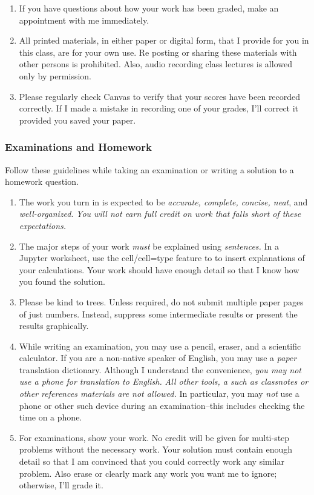 \documentclass[12pt,fullpage]{article}
\newcounter{ex}\setcounter{ex}{0}
\begin{document}
\begin{enumerate}
\item If you have questions about how your work has been graded, make
an appointment with me immediately.

\item All printed materials, in either paper or digital form, that I
provide for you in this class, are for your own use. Re posting or
sharing these materials with other persons is prohibited. Also,
audio recording class lectures is allowed only by permission.

\item Please regularly check Canvas  to verify that your scores have been recorded correctly.  If I made a mistake in recording one of
your grades, I'll correct it provided you saved your paper.

\end{enumerate}

\subsubsection*{Examinations and Homework}

Follow these guidelines while taking an examination or writing a solution to a homework question.

\begin{enumerate}

\item The work you turn in is expected to be \emph{accurate, complete, concise, neat}, and \emph{well-organized}.  \emph{You will not earn
full credit on work that falls short of these expectations.}

\item The major steps of your work \emph{must}  be explained using \emph{sentences.} In a  Jupyter worksheet, use the cell/cell=type feature to 
to insert explanations of your calculations. Your work should have enough detail so that I know how you found the solution. 

\item Please be kind to trees. Unless required, do not submit multiple paper pages of just numbers. Instead, suppress some intermediate results or 
present the results graphically.


\item While writing an examination, you may use a pencil, eraser, and a scientific calculator. If you are a non-native speaker of English,
you may use a \emph{paper} translation dictionary. Although I understand the convenience, \emph{you may not use a phone for translation to English.}
\emph{All other tools, a such as classnotes or other references materials are not allowed.} In particular, you may \emph{not} use a phone or other such
device during an examination--this includes checking the time on a phone.


\item For examinations, show your work.  No credit will be given for multi-step problems without the necessary work. Your solution must contain enough detail
so that I am convinced that you could correctly work any similar problem. Also erase or clearly mark any work you want me to ignore; otherwise,
I'll grade it.  

\end{enumerate}
\end{document}
